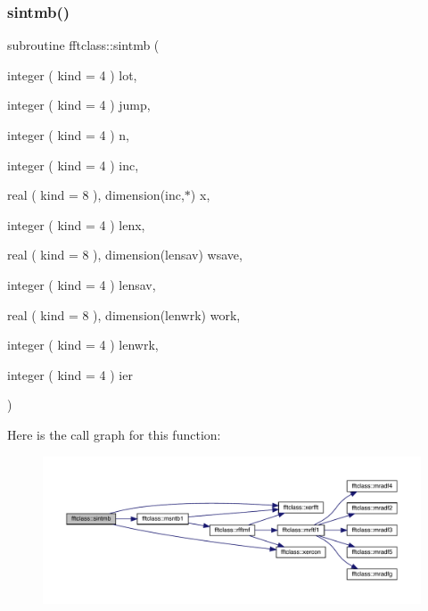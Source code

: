 \subsubsection{\texorpdfstring{sintmb()}{sintmb()}}
{\footnotesize\ttfamily subroutine fftclass\+::sintmb (\begin{DoxyParamCaption}\item[{integer ( kind = 4 )}]{lot,  }\item[{integer ( kind = 4 )}]{jump,  }\item[{integer ( kind = 4 )}]{n,  }\item[{integer ( kind = 4 )}]{inc,  }\item[{real ( kind = 8 ), dimension(inc,$\ast$)}]{x,  }\item[{integer ( kind = 4 )}]{lenx,  }\item[{real ( kind = 8 ), dimension(lensav)}]{wsave,  }\item[{integer ( kind = 4 )}]{lensav,  }\item[{real ( kind = 8 ), dimension(lenwrk)}]{work,  }\item[{integer ( kind = 4 )}]{lenwrk,  }\item[{integer ( kind = 4 )}]{ier }\end{DoxyParamCaption})}

Here is the call graph for this function\+:\nopagebreak
\begin{figure}[H]
\begin{center}
\leavevmode
\includegraphics[width=350pt]{namespacefftclass_a4d9b6f96810b5b7a8b7dd38af74f5b55_cgraph}
\end{center}
\end{figure}
\mbox{\label{namespacefftclass_a497c6a39bac7daa7973b53cb00ffd6c3}} 
